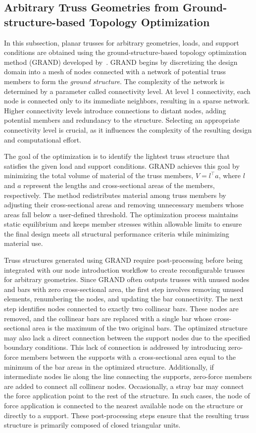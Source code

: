 \subsection{Arbitrary Truss Geometries from Ground-structure-based Topology Optimization}\label{02-subsec-grand}
In this subsection, planar trusses for arbitrary geometries, loads, and support conditions are obtained using the ground-structure-based topology optimization method (GRAND) developed by~\cite{zegard2014grand}. GRAND begins by discretizing the design domain into a mesh of nodes connected with a network of potential truss members to form the \textit{ground structure}. The complexity of the network is determined by a parameter called connectivity level. At level 1 connectivity, each node is connected only to its immediate neighbors, resulting in a sparse network. Higher connectivity levels introduce connections to distant nodes, adding potential members and redundancy to the structure. Selecting an appropriate connectivity level is crucial, as it influences the complexity of the resulting design and computational effort.

The goal of the optimization is to identify the lightest truss structure that satisfies the given load and support conditions. GRAND achieves this goal by minimizing the total volume of material of the truss members, \(V = l^{\top} a\), where \(l\) and \(a\) represent the lengths and cross-sectional areas of the members, respectively. The method redistributes material among truss members by adjusting their cross-sectional areas and removing unnecessary members whose areas fall below a user-defined threshold. The optimization process maintains static equilibrium and keeps member stresses within allowable limits to ensure the final design meets all structural performance criteria while minimizing material use.

Truss structures generated using GRAND require post-processing before being integrated with our node introduction workflow to create reconfigurable trusses for arbitrary geometries. Since GRAND often outputs trusses with unused nodes and bars with zero cross-sectional area, the first step involves removing unused elements, renumbering the nodes, and updating the bar connectivity. The next step identifies nodes connected to exactly two collinear bars. These nodes are removed, and the collinear bars are replaced with a single bar whose cross-sectional area is the maximum of the two original bars. The optimized structure may also lack a direct connection between the support nodes due to the specified boundary conditions. This lack of connection is addressed by introducing zero-force members between the supports with a cross-sectional area equal to the minimum of the bar areas in the optimized structure. Additionally, if intermediate nodes lie along the line connecting the supports, zero-force members are added to connect all collinear nodes. Occasionally, a stray bar may connect the force application point to the rest of the structure. In such cases, the node of force application is connected to the nearest available node on the structure or directly to a support. These post-processing steps ensure that the resulting truss structure is primarily composed of closed triangular units.

